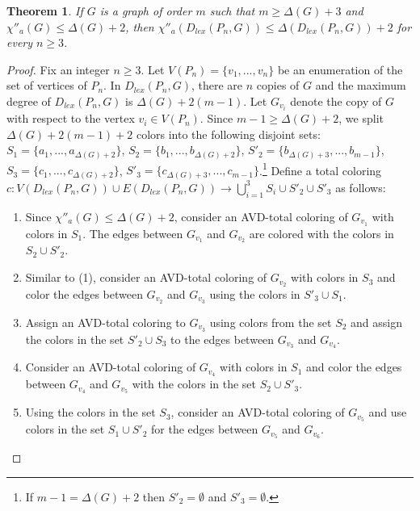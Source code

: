 \documentclass[12pt,reqno,a4paper]{amsart}
\theoremstyle{definition}
\theoremstyle{plain}
\newtheorem{thm}[defn]{Theorem}
\begin{document}
\begin{thm}\label{Theorem 3.6}
If $G$ is a graph of order $m$ such that $m\geq \Delta(G)+3$ and $\chi''_{a}(G)\leq \Delta(G)+2$, then $\chi''_{a}(D_{lex}(P_n, G))\leq \Delta(D_{lex}(P_n, G))+2$ for every  $n\geq 3$. 
\end{thm}

\begin{proof}
Fix an integer $n\geq 3$. Let $V(P_n)=\{v_1,...,v_n\}$ be an enumeration of the set of vertices of $P_n$. In $D_{lex}(P_n, G)$, there are $n$ copies of $G$ and the maximum degree of $D_{lex}(P_n, G)$ is $\Delta(G)+2(m-1)$. 
Let $G_{v_i}$ denote the copy of $G$ with respect to the vertex $v_i\in V(P_n)$.
Since $m-1\geq\Delta(G)+2$, we split $\Delta(G)+2(m-1)+2$ colors into the following disjoint sets:
$S_1=\{a_1,...,a_{\Delta(G)+2}\}$, $S_2=\{b_1,...,b_{\Delta(G)+2}\}$, $S'_{2}=\{b_{\Delta(G)+3},...,b_{m-1}\}$, $S_3=\{c_1,...,c_{\Delta(G)+2}\}$, $S'_{3}=\{c_{\Delta(G)+3},...,c_{m-1}\}$.\footnote{If $m-1=\Delta(G)+2$ then $S'_2=\emptyset$ and $S'_3=\emptyset$.} Define a total coloring
$c:V(D_{lex}(P_n,G))\cup E(D_{lex}(P_n,G))
\longrightarrow \bigcup_{i=1}^{3}S_i\cup S'_2\cup S'_3$ as follows: 

\begin{enumerate}
    \item Since $\chi''_{a}(G)\leq \Delta(G)+2$, consider an AVD-total coloring of $G_{v_1}$ with colors in $S_1$. 
    The edges between $G_{v_{1}}$ and $G_{v_{2}}$ are colored with the colors in $S_2\cup S'_2$.
    \item Similar to (1), consider 
    an AVD-total coloring of $G_{v_2}$ with colors in $S_3$ and color the edges between
    $G_{v_{2}}$ and $G_{v_{3}}$ using the colors in $S'_3\cup S_1$. 
    
    \item Assign an AVD-total coloring to $G_{v_3}$ using colors from the set $S_2$
    and assign the colors in the set $S'_2\cup S_3$ to the edges between $G_{v_3}$ and $G_{v_4}$.
    
    \item Consider 
    an AVD-total coloring of $G_{v_4}$ with colors in $S_1$ and color the edges between $G_{v_4}$ and $G_{v_5}$ with the colors in the set $S_2\cup S'_3$.

    \item Using the colors in the set $S_3$, consider 
    an AVD-total coloring of $G_{v_5}$
    and use colors in the set $S_1\cup S'_2$ for the edges between $G_{v_5}$ and $G_{v_6}$.


\end{enumerate}
\end{proof}
\end{document}
